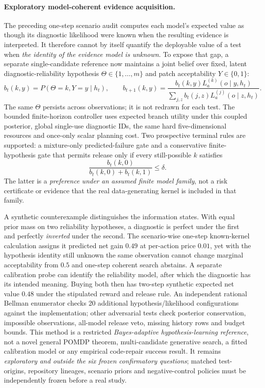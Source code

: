 \documentclass[pdflatex,sn-basic]{sn-jnl}
\begin{document}
\paragraph{Exploratory model-coherent evidence acquisition.}
The preceding one-step scenario audit computes each
model's expected value as though its diagnostic
likelihood were known when the resulting evidence
is interpreted. It therefore cannot by itself
quantify the deployable value of a test when
\emph{the identity of the evidence model is unknown}.
To expose that gap, a separate single-candidate
reference now maintains a joint belief over
fixed, latent diagnostic-reliability hypothesis
$\Theta\in\{1,\dots,m\}$ and patch acceptability
$Y\in\{0,1\}$:
\[
 b_t(k,y)=P(\Theta=k,Y=y\mid h_t),\qquad
 b_{t+1}(k,y)=
 \frac{b_t(k,y)L_a^{(k)}(o\mid y,h_t)}
 {\sum_{j,z}b_t(j,z)L_a^{(j)}(o\mid z,h_t)}.
\]
The same $\Theta$ persists across observations;
it is not redrawn for each test. The bounded
finite-horizon controller uses expected branch
utility under this coupled posterior, global
single-use diagnostic IDs, the same hard
five-dimensional resources and once-only scalar
planning cost. Two prospective terminal rules
are supported: a mixture-only predicted-failure
gate and a conservative finite-hypothesis gate
that permits release only if every still-possible
$k$ satisfies
\[
 \frac{b_t(k,0)}{b_t(k,0)+b_t(k,1)}
 \leq\delta .
\]
The latter is a \emph{preference under an assumed
finite model family}, not a risk certificate or
evidence that the real data-generating kernel is
included in that family.

A synthetic counterexample distinguishes the
information states. With equal prior mass on
two reliability hypotheses, a diagnostic
is perfect under the first and perfectly
\emph{inverted} under the second. The
scenario-wise one-step known-kernel calculation
assigns it predicted net gain $0.49$ at
per-action price $0.01$, yet with the hypothesis
identity still unknown the same observation
cannot change marginal acceptability from
$0.5$ and one-step coherent search abstains.
A separate calibration probe can identify
the reliability model, after which the
diagnostic has its intended meaning. Buying
both then has two-step synthetic expected
net value $0.48$ under the stipulated reward
and release rule. An independent rational
Bellman enumerator checks 20 additional
hypothesis/likelihood configurations against
the implementation; other adversarial tests
check posterior conservation, impossible
observations, all-model release veto, missing
history rows and budget bounds. This method
is a restricted \emph{Bayes-adaptive
hypothesis-learning reference}, not a novel
general POMDP theorem, multi-candidate
generative search, a fitted calibration model
or any empirical code-repair success result.
It remains \emph{exploratory and outside the
six frozen confirmatory questions}; matched
test-origins, repository lineages, scenario
priors and negative-control policies must be
independently frozen before a real study.
\end{document}
